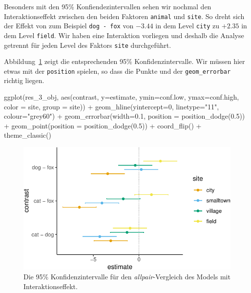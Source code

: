\documentclass[
  letterpaper,
]{scrbook}
\newenvironment{Shaded}{\begin{snugshade}}{\end{snugshade}}
\newcommand{\AttributeTok}[1]{\textcolor[rgb]{0.40,0.45,0.13}{#1}}
\newcommand{\DecValTok}[1]{\textcolor[rgb]{0.68,0.00,0.00}{#1}}
\newcommand{\FloatTok}[1]{\textcolor[rgb]{0.68,0.00,0.00}{#1}}
\newcommand{\FunctionTok}[1]{\textcolor[rgb]{0.28,0.35,0.67}{#1}}
\newcommand{\NormalTok}[1]{\textcolor[rgb]{0.00,0.23,0.31}{#1}}
\newcommand{\SpecialCharTok}[1]{\textcolor[rgb]{0.37,0.37,0.37}{#1}}
\newcommand{\StringTok}[1]{\textcolor[rgb]{0.13,0.47,0.30}{#1}}
\begin{document}
Besonders mit den 95\% Konfiendezintervallen sehen wir nochmal den
Interaktionseffekt zwischen den beiden Faktoren \texttt{animal} und
\texttt{site}. So dreht sich der Effekt von zum Beispiel
\texttt{dog\ -\ fox} von \(-3.44\) in dem Level \texttt{city} zu
\(+2.35\) in dem Level \texttt{field}. Wir haben eine Interaktion
vorliegen und deshalb die Analyse getrennt für jeden Level des Faktors
\texttt{site} durchgeführt.

Abbildung~\ref{fig-emmeans-2} zeigt die entsprechenden 95\%
Konfidenzintervalle. Wir müssen hier etwas mit der \texttt{position}
spielen, so dass die Punkte und der \texttt{geom\_errorbar} richtig
liegen.

\begin{Shaded}
\begin{Highlighting}[]
  \FunctionTok{ggplot}\NormalTok{(res\_3\_obj, }\FunctionTok{aes}\NormalTok{(contrast, }\AttributeTok{y=}\NormalTok{estimate, }\AttributeTok{ymin=}\NormalTok{conf.low, }\AttributeTok{ymax=}\NormalTok{conf.high,}
                        \AttributeTok{color =}\NormalTok{ site, }\AttributeTok{group =}\NormalTok{ site)) }\SpecialCharTok{+}
    \FunctionTok{geom\_hline}\NormalTok{(}\AttributeTok{yintercept=}\DecValTok{0}\NormalTok{, }\AttributeTok{linetype=}\StringTok{"11"}\NormalTok{, }\AttributeTok{colour=}\StringTok{"grey60"}\NormalTok{) }\SpecialCharTok{+}
    \FunctionTok{geom\_errorbar}\NormalTok{(}\AttributeTok{width=}\FloatTok{0.1}\NormalTok{, }\AttributeTok{position =} \FunctionTok{position\_dodge}\NormalTok{(}\FloatTok{0.5}\NormalTok{)) }\SpecialCharTok{+} 
    \FunctionTok{geom\_point}\NormalTok{(}\AttributeTok{position =} \FunctionTok{position\_dodge}\NormalTok{(}\FloatTok{0.5}\NormalTok{)) }\SpecialCharTok{+}
    \FunctionTok{coord\_flip}\NormalTok{() }\SpecialCharTok{+}
    \FunctionTok{theme\_classic}\NormalTok{()}
\end{Highlighting}
\end{Shaded}

\begin{figure}[H]

{\centering \includegraphics{./stat-tests-posthoc_files/figure-pdf/fig-emmeans-2-1.pdf}

}

\caption{\label{fig-emmeans-2}Die 95\% Konfidenzintervalle für den
\emph{allpair}-Vergleich des Models mit Interaktionseffekt.}

\end{figure}
\end{document}
